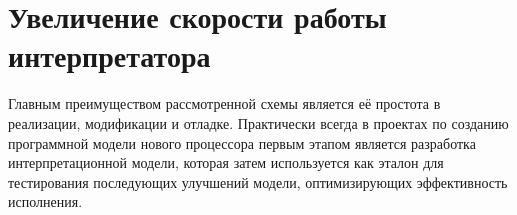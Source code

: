 %     
%     
% 

\section[Увеличение скорости работы]{Увеличение скорости работы интерпретатора}

Главным преимуществом рассмотренной схемы является её простота в реализации, модификации и отладке. Практически всегда в проектах по созданию программной модели нового процессора первым этапом является разработка интерпретационной модели, которая затем используется как эталон для тестирования последующих улучшений модели, оптимизирующих эффективность исполнения.

